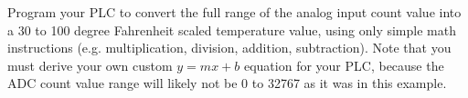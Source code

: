 Program your PLC to convert the full range of the analog input count value into a 30 to 100 degree Fahrenheit scaled temperature value, using only simple math instructions (e.g. multiplication, division, addition, subtraction).  Note that you must derive your own custom $y = mx + b$ equation for your PLC, because the ADC count value range will likely not be 0 to 32767 as it was in this example.


















